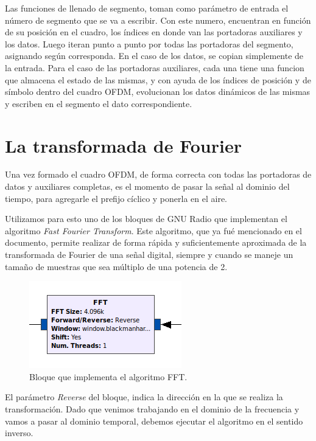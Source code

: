 Las funciones de llenado de segmento, toman como parámetro de entrada el número de segmento que se va a escribir. Con este numero, encuentran en función de su posición en el cuadro, los índices en donde van las portadoras auxiliares y los datos. Luego iteran punto a punto por todas las portadoras del segmento, asignando según corresponda. En el caso de los datos, se copian simplemente de la entrada. Para el caso de las portadoras auxiliares, cada una tiene una funcion que almacena el estado de las mismas, y con ayuda de los índices de posición y de símbolo dentro del cuadro OFDM, evolucionan los datos dinámicos de las mismas y escriben en el segmento el dato correspondiente. 
	
\section{La transformada de Fourier}

Una vez formado el cuadro OFDM, de forma correcta con todas las portadoras de datos y auxiliares completas, es el momento de pasar la señal al dominio del tiempo, para agregarle el prefijo cíclico y ponerla en el aire. 

Utilizamos para esto uno de los bloques de GNU Radio que implementan el algoritmo \textit{Fast Fourier Transform}. Este algoritmo, que ya fué mencionado en el documento, permite realizar de forma rápida y suficientemente aproximada de la transformada de Fourier de una señal digital, siempre y cuando se maneje un tamaño de muestras que sea múltiplo de una potencia de 2.

\begin{figure}[!h]
	\centering
	\includegraphics[scale=0.5]{figuras/cap05/fft}
	\caption{\label{f:fft} Bloque que implementa el algoritmo FFT.}
\end{figure}

El parámetro \textit{Reverse} del bloque, indica la dirección en la que se realiza la transformación. Dado que venimos trabajando en el dominio de la frecuencia y vamos a pasar al dominio temporal, debemos ejecutar el algoritmo en el sentido inverso.

